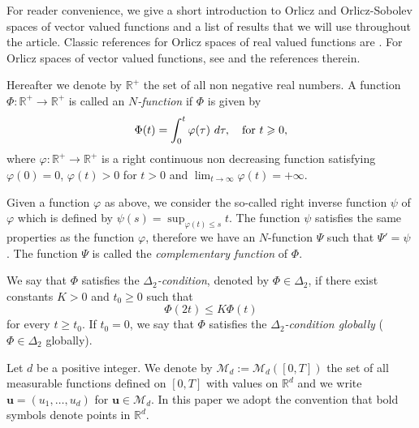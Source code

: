 \documentclass[twoside]{article}
\theoremstyle{remark}
\renewcommand{\b}[1]{\boldsymbol{#1}}
\renewcommand{\leq}{\leqslant}
\renewcommand{\geq}{\geqslant}
\begin{document}
For reader convenience, we give a short introduction to Orlicz and Orlicz-Sobolev spaces of vector valued functions and a  list  of results that we will use throughout the article. 
Classic references for Orlicz spaces of real valued functions are \cite{adams_sobolev,KR,rao1991theory}.
For  Orlicz spaces of vector valued functions, see \cite{Orliczvectorial2005} and the references therein.

Hereafter we denote  by $\mathbb{R}^+$  the set of all non negative real numbers. A function $\Phi:\mathbb{R}^+\to \mathbb{R}^+ $ is called an \emph{$N$-function} if $\Phi$ is given by 
\[
\Phi(t)=\int_{0}^t \varphi(\tau)\ d\tau,\quad\hbox{for } t\geq 0,
\]
where $\varphi:\mathbb{R}^+\rightarrow \mathbb{R}^+$ is a right continuous non decreasing function  satisfying   $\varphi(0)=0$, $\varphi(t)>0$ for $t>0$ and
$\lim_{t\rightarrow \infty}\varphi(t)=+\infty$.

Given a function $\varphi$ as above, we  consider the so-called right inverse function $\psi$ of $\varphi$ which is 
defined by $\psi(s)=\sup_{\varphi(t)\leq s}t$.
The function $\psi$ satisfies the same properties as the function $\varphi$, therefore we have an $N$-function $\Psi$ such that $\Psi'=\psi$ .
 The function $\Psi$ is called the \emph{complementary function} of $\Phi$.


We say that $\Phi$ satisfies the  \emph{$\Delta_2$-condition}, denoted by $\Phi \in \Delta_2$, 
if there exist  constants $K>0$ and  $t_0\geq 0$ such that 
\begin{equation}\label{delta2defi}\Phi(2t)\leq K\Phi(t)
\end{equation}
for every $t\geq t_0$. 
If $t_0=0$,  we say that $\Phi$ satisfies the \emph{$\Delta_2$-condition globally} ($\Phi \in \Delta_2$ globally).  


Let $d$ be a positive integer. We denote by $\mathcal{M}_d:=\mathcal{M}_d([0,T])$ the set of all measurable functions defined on $[0,T]$ with values on $\mathbb{R}^d$ and  we write $\b{u}=(u_1,\dots,u_d)$ for  $\b{u}\in \mathcal{M}_d$.
In this paper we adopt the convention that bold symbols denote points in $\mathbb{R}^d$.
\end{document}
